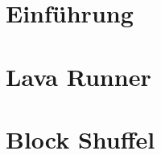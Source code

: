\documentclass{article}
\begin{document}
	\section{Einführung}
		
	\section{Lava Runner}
	\section{Block Shuffel}
\end{document}
